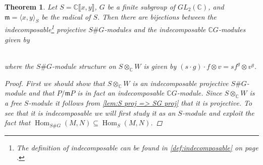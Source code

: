 \documentclass[11pt, a4paper, english]{article}
\newtheorem{theorem}{Theorem}[section]
\theoremstyle{definition}
\newcommand{\C}{\mathbb{C}}
\DeclareMathOperator{\Hom}{Hom}
\begin{document}
\begin{theorem}
\label{thm:indec_proj_SG=indec_CG}
Let $S = \C\llbracket x, y \rrbracket$, $G$ be a finite subgroup of $GL_2(\C)$, and $\mathfrak{m} = \langle x, y \rangle_S$ be the radical of $S$. Then there are bijections between the indecomposable\footnote{The definition of indecomposable can be found in \cref{def:indecomposable} on page \pageref{def:indecomposable}.} projective $S\#G$-modules and the indecomposable $\C G$-modules given by
\\
\\
\begin{center}
\end{center}

where the $S\#G$-module structure on $S \otimes_\C W$ is given by $(s \cdot g) \cdot f \otimes v = sf^g \otimes v^g$.

\begin{proof}
First we should show that $S \otimes_\C W$ is an indecomposable projective $S\#G$-module and that $P/\mathfrak{m}P$ is in fact an indecomposable $\C G$-module. Since $S \otimes_\C W$ is a free $S$-module it follows from \cref{lem:S proj => SG proj} that it is projective. To see that it is indecomposable we will first study it as an $S$-module and exploit the fact that $\Hom_{S\#G}(M,N) \subseteq \Hom_S(M,N)$. 


\end{proof}
\end{theorem}
\end{document}
